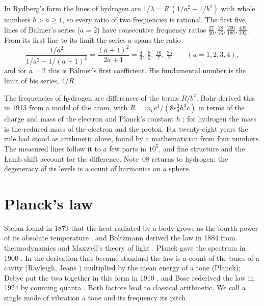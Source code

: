 \documentclass[11pt]{article}
\begin{document}
\begin{derivation}\label{d:balmer}
In Rydberg's form \cite{Rydberg} the lines of hydrogen are $1/\lambda = R\,(1/a^2 - 1/b^2)$ with whole numbers $b>a\ge1$, so every ratio of two frequencies is rational.
The first five lines of Balmer's series ($a=2$) have consecutive frequency ratios $\tfrac{27}{20}, \tfrac{28}{25}, \tfrac{200}{189}, \tfrac{405}{392}$.
From its first line to its limit the series $a$ spans the ratio
\[
  \frac{1/a^2}{1/a^2 - 1/(a+1)^2} = \frac{(a+1)^2}{2a+1} = \tfrac43,\ \tfrac95,\ \tfrac{16}7,\ \tfrac{25}9\qquad(a = 1,2,3,4),
\]
and for $a=2$ this is Balmer's first coefficient.
His fundamental number is the limit of his series, $4/R$.
\end{derivation}

\physical
The frequencies of hydrogen are differences of the terms $R/b^2$.
Bohr derived this in 1913 from a model of the atom, with $R = m_{\mathrm e}e^4/(8\varepsilon_0^2h^3c)$ in terms of the charge and mass of the electron and Planck's constant $h$ \cite{Bohr}; for hydrogen the mass is the reduced mass of the electron and the proton.
For twenty-eight years the rule had stood as arithmetic alone, found by a mathematician from four numbers.
The measured lines follow it to a few parts in $10^5$, and fine structure and the Lamb shift account for the difference.
Note~08 returns to hydrogen: the degeneracy of its levels is a count of harmonics on a sphere.

\section{Planck's law}

Stefan found in 1879 that the heat radiated by a body grows as the fourth power of its absolute temperature \cite{Stefan}, and Boltzmann derived the law in 1884 from thermodynamics and Maxwell's theory of light \cite{Boltzmann}.
Planck gave the spectrum in 1900 \cite{Planck}.
In the derivation that became standard the law is a count of the tones of a cavity (Rayleigh, Jeans \cite{Rayleigh, Jeans}) multiplied by the mean energy of a tone (Planck); Debye put the two together in this form in 1910 \cite{Debye}, and Bose rederived the law in 1924 by counting quanta \cite{Bose}.
Both factors lead to classical arithmetic.
We call a single mode of vibration a tone and its frequency its pitch.
\end{document}

